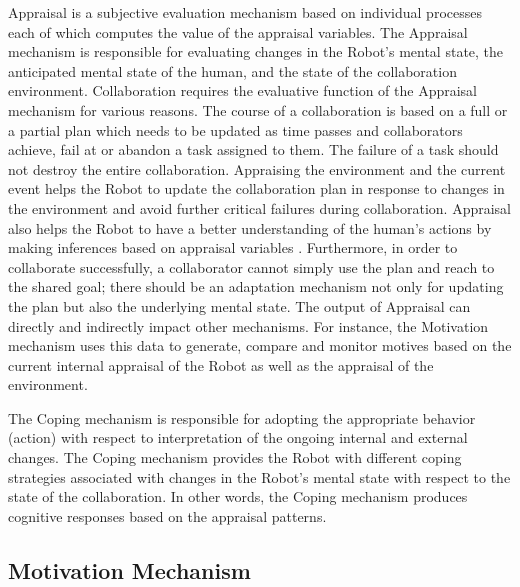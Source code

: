 Appraisal is a subjective evaluation mechanism based on individual processes
each of which computes the value of the appraisal variables. The Appraisal
mechanism is responsible for evaluating changes in the Robot's mental state, the
anticipated mental state of the human, and the state of the collaboration
environment. Collaboration requires the evaluative function of the Appraisal
mechanism for various reasons. The course of a collaboration is based on a full
or a partial plan \cite{grosz:collaboration,grosz:discourse-structure} which
needs to be updated as time passes and collaborators achieve, fail at or abandon
a task assigned to them. The failure of a task should not destroy the entire
collaboration. Appraising the environment and the current event helps the Robot
to update the collaboration plan in response to changes in the environment and
avoid further critical failures during collaboration. Appraisal also helps the
Robot to have a better understanding of the human's actions by making inferences
based on appraisal variables \cite{marsella:ema-process-model}
\cite{scherer:appraisal-processes}. Furthermore, in order to collaborate
successfully, a collaborator cannot simply use the plan and reach to the shared
goal; there should be an adaptation mechanism not only for updating the plan but
also the underlying mental state. The output of Appraisal can directly and
indirectly impact other mechanisms. For instance, the Motivation mechanism uses
this data to generate, compare and monitor motives based on the current internal
appraisal of the Robot as well as the appraisal of the environment.

The Coping mechanism is responsible for adopting the appropriate behavior
(action) with respect to interpretation of the ongoing internal and external
changes. The Coping mechanism provides the Robot with different coping
strategies associated with changes in the Robot's mental state with respect to
the state of the collaboration. In other words, the Coping mechanism produces
cognitive responses based on the appraisal patterns.

\subsection{Motivation Mechanism}
\label{sec:motivation-mech}

